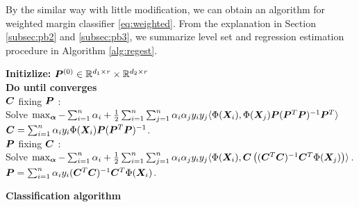 \documentclass[12pt]{article}
\begin{document}
By the similar way with little modification, we can obtain an algorithm for weighted margin classifier \eqref{eq:weighted}. From the explanation in Section \ref{subsec:pb2} and \ref{subsec:pb3}, we summarize level set and regression estimation procedure in Algorithm \ref{alg:regest}.
 \begin{algorithm}[h]
{\bf Initizlize:} $\bm{P}^{(0)}\in\mathbb{R}^{d_1\times r}\times \mathbb{R}^{d_2\times r}$\\
{\bf Do until converges}\\
\hspace*{.5cm}{\bf Update} $\bm C$ fixing $\bm{P}$ :\\[.1cm]
\hspace*{.4cm} Solve $\max_{\bm\alpha}-\sum_{i=1}^n\alpha_i + \frac{1}{2}\sum_{i=1}^n\sum_{j=1}^n \alpha_i\alpha_j y_iy_j \langle \Phi(\bm X_i),\Phi(\bm X_j)\bm{P}(\bm{P}^T\bm{P})^{-1}\bm{P}^T\rangle$\\
\hspace{.5cm} $\bm C = \sum_{i=1}^n \alpha_iy_i \Phi(\bm X_i) \bm{P}(\bm{P}^T\bm{P})^{-1}$.\\[.1cm]
\hspace*{.5cm}{\bf Update} $\bm{P}$ fixing $\bm C$ :\\[.1cm]
\hspace*{.4cm} Solve  $ \max_{\bm\alpha}-\sum_{i=1}^n\alpha_i + \frac{1}{2}\sum_{i=1}^n\sum_{j=1}^n \alpha_i\alpha_j y_iy_j\langle 
    \Phi(\bm X_i),\bm C\left((\bm C^T\bm C)^{-1}\bm C^T\Phi(\bm X_j)\right)\rangle$.\\
\hspace{.5cm} $\bm{P} = \sum_{i=1}^n\alpha_iy_i(\bm C^T\bm C)^{-1}\bm C^T\Phi(\bm X_i)$.\\[.1cm]
    \caption{{\bf Classification algorithm} } \label{alg:svm}
\end{algorithm}
\end{document}
